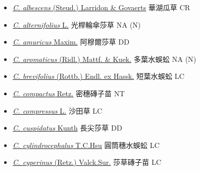 \begin{itemize}
  \begin{itemize}
        \item[] \href{http://www.theplantlist.org/tpl1.1/search?q=Cyperus+albescens}{\textit{C. albescens} (Steud.) Larridon \& Govaerts}   華湖瓜草   CR
        \item[] \href{http://www.theplantlist.org/tpl1.1/search?q=Cyperus+alternifolius}{\textit{C. alternifolius} L.}   光桿輪傘莎草   NA (N)
        \item[] \href{http://www.theplantlist.org/tpl1.1/search?q=Cyperus+amuricus}{\textit{C. amuricus} Maxim.}   阿穆爾莎草   DD
        \item[] \href{http://www.theplantlist.org/tpl1.1/search?q=Cyperus+aromaticus}{\textit{C. aromaticus} (Ridl.) Mattf. \& Kuek.}   多葉水蜈蚣   NA (N)
        \item[] \href{http://www.theplantlist.org/tpl1.1/search?q=Cyperus+brevifolius}{\textit{C. brevifolius} (Rottb.) Endl. ex Hassk.}   短葉水蜈蚣   LC
        \item[] \href{http://www.theplantlist.org/tpl1.1/search?q=Cyperus+compactus}{\textit{C. compactus} Retz.}   密穗磚子苗   NT
        \item[] \href{http://www.theplantlist.org/tpl1.1/search?q=Cyperus+compressus}{\textit{C. compressus} L.}   沙田草   LC
        \item[] \href{http://www.theplantlist.org/tpl1.1/search?q=Cyperus+cuspidatus}{\textit{C. cuspidatus} Kunth}   長尖莎草   DD
        \item[] \href{http://www.theplantlist.org/tpl1.1/search?q=Cyperus+cylindrocephalus}{\textit{C. cylindrocephalus} T.C.Hsu}   圓筒穗水蜈蚣   LC
        \item[] \href{http://www.theplantlist.org/tpl1.1/search?q=Cyperus+cyperinus}{\textit{C. cyperinus} (Retz.) Valck.Sur.}   莎草磚子苗   LC

\end{itemize}
\end{itemize}
